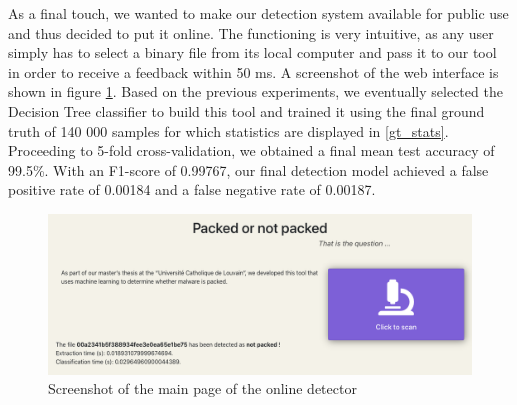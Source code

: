 As a final touch, we wanted to make our detection system available for public use and thus decided to put it online. The functioning is very intuitive, as any user simply has to select a binary file from its local computer and pass it to our tool in order to receive a feedback within 50 ms. A screenshot of the web interface is shown in figure \ref{fig:online_tool}. Based on the previous experiments, we eventually selected the Decision Tree classifier to build this tool and trained it using the final ground truth of 140 000 samples for which statistics are displayed in \autoref{gt_stats}. Proceeding to 5-fold cross-validation, we obtained a final mean test accuracy of 99.5\%. With an F1-score of 0.99767, our final detection model achieved a false positive rate of 0.00184 and a false negative rate of 0.00187.

\begin{figure}[!h]
    \centering
    \includegraphics[width=\textwidth]{Figures/tools.png}
    \caption{Screenshot of the main page of the online detector}
    \label{fig:online_tool}
\end{figure}